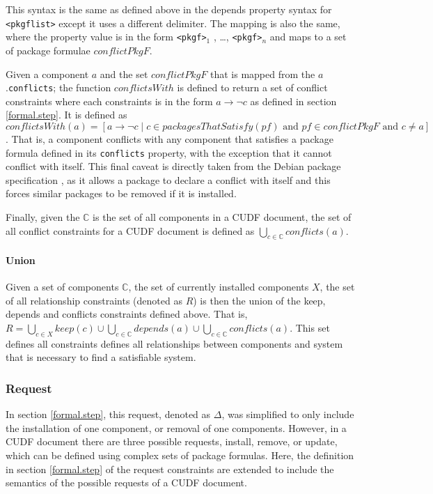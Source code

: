 This syntax is the same as defined above in the depends property syntax for \verb+<pkgflist>+ except it uses a different delimiter. 
The mapping is also the same, where the property value is in the form \verb+<pkgf>+$_1$ , \ldots , \verb+<pkgf>+$_n$ and maps to a set of package formulae $conflictPkgF$.

Given a component $a$ and the set $conflictPkgF$ that is mapped from the $a$.\verb+conflicts+;
the function $conflictsWith$ is defined to return a set of conflict constraints where each constraints is in the form $a \rightarrow \neg c$ as defined in section \ref{formal.step}.
It is defined as $conflictsWith(a) = [a \rightarrow \neg c \mid c \in packagesThatSatisfy(pf) \mbox{ and } pf \in conflictPkgF \mbox { and } c \not = a]$.
That is, a component conflicts with any component that satisfies a package formula defined in its \verb+conflicts+ property,
with the exception that it cannot conflict with itself.
This final caveat is directly taken from the Debian package specification \citep{Barth2005}, as it allows a package to declare a conflict with itself and this forces similar packages to be removed if it is installed.  

Finally, given the $\mathbb{C}$ is the set of all components in a CUDF document,
the set of all conflict constraints for a CUDF document is defined as $\bigcup \limits_{c\in \mathbb{C}} conflicts(a)$.

\paragraph{Union}
Given a set of components $\mathbb{C}$, the set of currently installed components $X$, 
the set of all relationship constraints (denoted as $R$) is then the union of the keep, depends and conflicts constraints defined above.
That is, $R = \bigcup \limits_{c \in X} keep(c) \cup \bigcup \limits_{c\in \mathbb{C}} depends(a) \cup \bigcup \limits_{c\in \mathbb{C}} conflicts(a)$.
This set defines all constraints defines all relationships between components and system that is necessary to find a satisfiable system.

\subsubsection{Request}
In section \ref{formal.step}, this request, denoted as $\Delta$, was simplified to only include the installation of one component, or removal of one components.
However, in a CUDF document there are three possible requests, install, remove, or update, which can be defined using complex sets of package formulas.
Here, the definition in section \ref{formal.step} of the request constraints are extended to include the semantics of the possible requests of a CUDF document.

